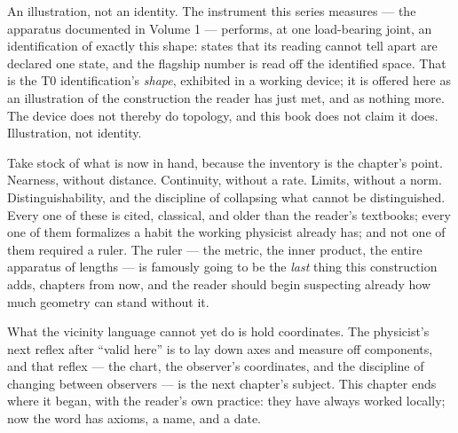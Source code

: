 \begin{fence}
An illustration, not an identity. The instrument this series measures --- the
apparatus documented in Volume 1 --- performs, at one load-bearing joint, an
identification of exactly this shape: states that its reading cannot tell
apart are declared one state, and the flagship number is read off the
identified space. That is the T0 identification's \emph{shape}, exhibited in a
working device; it is offered here as an illustration of the construction the
reader has just met, and as nothing more. The device does not thereby do
topology, and this book does not claim it does. Illustration, not identity.
\end{fence}

Take stock of what is now in hand, because the inventory is the chapter's
point. Nearness, without distance. Continuity, without a rate. Limits, without
a norm. Distinguishability, and the discipline of collapsing what cannot be
distinguished. Every one of these is cited, classical, and older than the
reader's textbooks; every one of them formalizes a habit the working physicist
already has; and not one of them required a ruler. The ruler --- the metric,
the inner product, the entire apparatus of lengths --- is famously going to be
the \emph{last} thing this construction adds, chapters from now, and the
reader should begin suspecting already how much geometry can stand without it.

What the vicinity language cannot yet do is hold coordinates. The physicist's
next reflex after ``valid here'' is to lay down axes and measure off
components, and that reflex --- the chart, the observer's coordinates, and the
discipline of changing between observers --- is the next chapter's subject.
This chapter ends where it began, with the reader's own practice: they have
always worked locally; now the word has axioms, a name, and a date.
